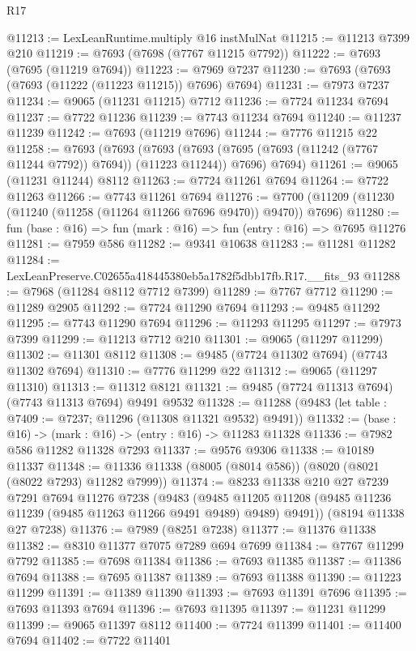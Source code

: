 \begin{lexlean}{R17}
\begin{coremodule}
@11213 := LexLeanRuntime.multiply @16 instMulNat
@11215 := @11213 @7399 @210
@11219 := @7693 (@7698 (@7767 @11215 @7792))
@11222 := @7693 (@7695 (@11219 @7694))
@11223 := @7969 @7237
@11230 := @7693 (@7693 (@7693 (@11222 (@11223 @11215)) @7696) @7694)
@11231 := @7973 @7237
@11234 := @9065 (@11231 @11215) @7712
@11236 := @7724 @11234 @7694
@11237 := @7722 @11236
@11239 := @7743 @11234 @7694
@11240 := @11237 @11239
@11242 := @7693 (@11219 @7696)
@11244 := @7776 @11215 @22
@11258 := @7693
    (@7693
      (@7693 (@7693 (@7695 (@7693 (@11242 (@7767 @11244 @7792)) @7694)) (@11223 @11244)) @7696)
      @7694)
@11261 := @9065 (@11231 @11244) @8112
@11263 := @7724 @11261 @7694
@11264 := @7722 @11263
@11266 := @7743 @11261 @7694
@11276 := @7700 (@11209 (@11230 (@11240 (@11258 (@11264 @11266 @7696 @9470)) @9470)) @7696)
@11280 := fun (base : @16) => fun (mark : @16) => fun (entry : @16) => @7695 @11276
@11281 := @7959 @586
@11282 := @9341 @10638
@11283 := @11281 @11282
@11284 := LexLeanPreserve.C02655a418445380eb5a1782f5dbb17fb.R17.__fits_93
@11288 := @7968 (@11284 @8112 @7712 @7399)
@11289 := @7767 @7712
@11290 := @11289 @2905
@11292 := @7724 @11290 @7694
@11293 := @9485 @11292
@11295 := @7743 @11290 @7694
@11296 := @11293 @11295
@11297 := @7973 @7399
@11299 := @11213 @7712 @210
@11301 := @9065 (@11297 @11299)
@11302 := @11301 @8112
@11308 := @9485 (@7724 @11302 @7694) (@7743 @11302 @7694)
@11310 := @7776 @11299 @22
@11312 := @9065 (@11297 @11310)
@11313 := @11312 @8121
@11321 := @9485 (@7724 @11313 @7694) (@7743 @11313 @7694) @9491 @9532
@11328 := @11288 (@9483 (let table : @7409 := @7237; @11296 (@11308 @11321 @9532) @9491))
@11332 := (base : @16) -> (mark : @16) -> (entry : @16) -> @11283 @11328
@11336 := @7982 @586 @11282 @11328 @7293
@11337 := @9576 @9306
@11338 := @10189 @11337
@11348 := @11336 @11338 (@8005 (@8014 @586)) (@8020 (@8021 (@8022 @7293) @11282 @7999))
@11374 := @8233
    @11338
    @210
    @27
    @7239
    @7291
    @7694
    @11276
    @7238
    (@9483
      (@9485 @11205 @11208 (@9485 @11236 @11239 (@9485 @11263 @11266 @9491 @9489) @9489) @9491))
    (@8194 @11338 @27 @7238)
@11376 := @7989 (@8251 @7238)
@11377 := @11376 @11338
@11382 := @8310 @11377 @7075 @7289 @694 @7699
@11384 := @7767 @11299 @7792
@11385 := @7698 @11384
@11386 := @7693 @11385
@11387 := @11386 @7694
@11388 := @7695 @11387
@11389 := @7693 @11388
@11390 := @11223 @11299
@11391 := @11389 @11390
@11393 := @7693 @11391 @7696
@11395 := @7693 @11393 @7694
@11396 := @7693 @11395
@11397 := @11231 @11299
@11399 := @9065 @11397 @8112
@11400 := @7724 @11399
@11401 := @11400 @7694
@11402 := @7722 @11401

\end{coremodule}
\end{lexlean}
